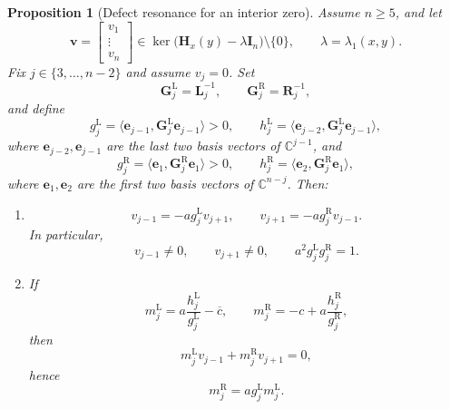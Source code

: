 \documentclass[11pt]{article}
\numberwithin{equation}{section}
\newtheorem{proposition}[theorem]{Proposition}
\newcommand{\C}{\mathbb C}
\newcommand{\I}{\mathbf I}
\newcommand{\Hmat}{\mathbf H}
\begin{document}
\begin{proposition}[Defect resonance for an interior zero]\label{prop:defect}
Assume \(n\ge5\), and let
\[
\bm v=
\begin{bmatrix}
v_1\\
\vdots\\
v_n
\end{bmatrix}
\in
\ker\bigl(\Hmat_x(y)-\lambda\I_n\bigr)\setminus\{0\},
\qquad
\lambda=\lambda_1(x,y).
\]
Fix \(j\in\{3,\dots,n-2\}\) and assume \(v_j=0\).
Set
\[
\mathbf G_j^{\mathrm L}=\mathbf L_j^{-1},
\qquad
\mathbf G_j^{\mathrm R}=\mathbf R_j^{-1},
\]
and define
\[
g_j^{\mathrm L}
=
\langle \bm e_{j-1},\mathbf G_j^{\mathrm L}\bm e_{j-1}\rangle>0,
\qquad
h_j^{\mathrm L}
=
\langle \bm e_{j-2},\mathbf G_j^{\mathrm L}\bm e_{j-1}\rangle,
\]
where \(\bm e_{j-2},\bm e_{j-1}\) are the last two basis vectors of \(\C^{j-1}\), and
\[
g_j^{\mathrm R}
=
\langle \bm e_1,\mathbf G_j^{\mathrm R}\bm e_1\rangle>0,
\qquad
h_j^{\mathrm R}
=
\langle \bm e_2,\mathbf G_j^{\mathrm R}\bm e_1\rangle,
\]
where \(\bm e_1,\bm e_2\) are the first two basis vectors of \(\C^{n-j}\).
Then:
\begin{enumerate}
\item
\[
v_{j-1}=-ag_j^{\mathrm L}v_{j+1},
\qquad
v_{j+1}=-ag_j^{\mathrm R}v_{j-1}.
\]
In particular,
\[
v_{j-1}\neq0,
\qquad
v_{j+1}\neq0,
\qquad
a^2g_j^{\mathrm L}g_j^{\mathrm R}=1.
\]

\item
If
\[
m_j^{\mathrm L}=a\frac{h_j^{\mathrm L}}{g_j^{\mathrm L}}-\overline c,
\qquad
m_j^{\mathrm R}=-c+a\frac{h_j^{\mathrm R}}{g_j^{\mathrm R}},
\]
then
\[
m_j^{\mathrm L}v_{j-1}+m_j^{\mathrm R}v_{j+1}=0,
\]
hence
\[
m_j^{\mathrm R}=ag_j^{\mathrm L}m_j^{\mathrm L}.
\]
\end{enumerate}
\end{proposition}
\end{document}
